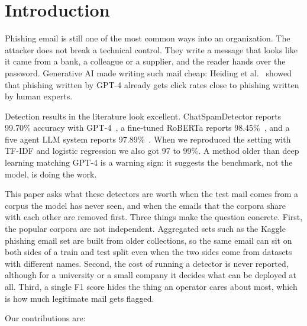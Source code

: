 \section{Introduction}

Phishing email is still one of the most common ways into an organization. The
attacker does not break a technical control. They write a message that looks
like it came from a bank, a colleague or a supplier, and the reader hands over
the password. Generative AI made writing such mail cheap: Heiding et
al.~\cite{heiding} showed that phishing written by GPT-4 already gets click
rates close to phishing written by human experts.

Detection results in the literature look excellent. ChatSpamDetector reports
99.70\% accuracy with GPT-4~\cite{koide}, a fine-tuned RoBERTa reports
98.45\%~\cite{uddin}, and a five agent LLM system reports 97.89\%~\cite{multiphish}.
When we reproduced the setting with TF-IDF and logistic regression we also got
97 to 99\%. A method older than deep learning matching GPT-4 is a warning sign:
it suggests the benchmark, not the model, is doing the work.

This paper asks what these detectors are worth when the test mail comes from a
corpus the model has never seen, and when the emails that the corpora share
with each other are removed first. Three things make the question concrete.
First, the popular corpora are not independent. Aggregated sets such as the
Kaggle phishing email set are built from older collections, so the same email
can sit on both sides of a train and test split even when the two sides come
from datasets with different names. Second, the cost of running a detector is
never reported, although for a university or a small company it decides what
can be deployed at all. Third, a single F1 score hides the thing an operator
cares about most, which is how much legitimate mail gets flagged.

Our contributions are:

